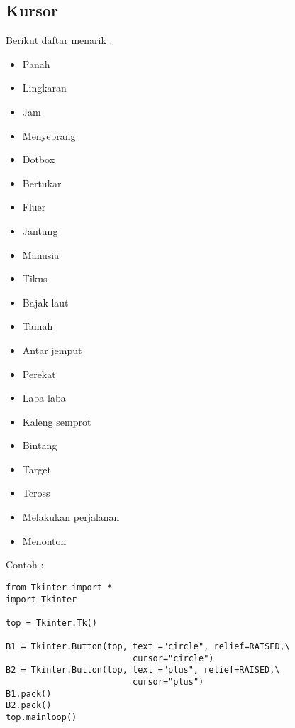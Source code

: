 \documentclass [12pt,a4paper,notitlepage,oneside,bahasa]{article}
\begin{document}
\begin{enumerate}
\begin{itemize}
\subsection{Kursor} \par
\noindent 
Berikut daftar menarik : \par
\noindent 
\begin{itemize}
	\item Panah 
	\item Lingkaran
	\item Jam 
	\item Menyebrang 
	\item Dotbox 
	\item Bertukar
	\item Fluer 
	\item Jantung 
	\item Manusia 
	\item Tikus
	\item Bajak laut 
	\item Tamah 
	\item Antar jemput 
	\item Perekat
	\item Laba-laba
	\item Kaleng semprot
	\item Bintang
	\item Target 
	\item Tcross 
	\item Melakukan perjalanan
	\item Menonton
\end{itemize}

\vspace{12pt}
Contoh : \par
\begin{verbatim}
from Tkinter import *
import Tkinter

top = Tkinter.Tk()

B1 = Tkinter.Button(top, text ="circle", relief=RAISED,\
                         cursor="circle")
B2 = Tkinter.Button(top, text ="plus", relief=RAISED,\
                         cursor="plus")
B1.pack()
B2.pack()
top.mainloop()

\end{verbatim}

\end{itemize}
\end{enumerate}
\end{document}
